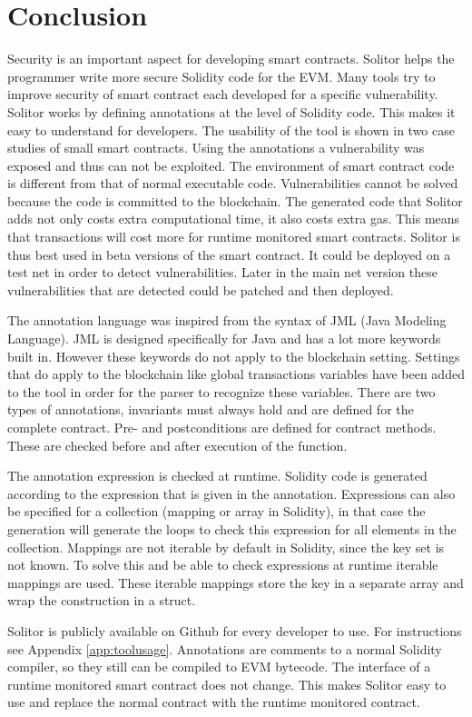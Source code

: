 \documentclass[a4paper]{article}
\begin{document}
\newpage
\section{Conclusion}
\label{sec:conclusion}
Security is an important aspect for developing smart contracts. Solitor helps the programmer write more secure Solidity code for the EVM. Many tools try to improve security of smart contract each developed for a specific vulnerability. Solitor works by defining annotations at the level of Solidity code. This makes it easy to understand for developers. The usability of the tool is shown in two case studies of small smart contracts. Using the annotations a vulnerability was exposed and thus can not be exploited. The environment of smart contract code is different from that of normal executable code. Vulnerabilities cannot be solved because the code is committed to the blockchain. The generated code that Solitor adds not only costs extra computational time, it also costs extra gas. This means that transactions will cost more for runtime monitored smart contracts. Solitor is thus best used in beta versions of the smart contract. It could be deployed on a test net in order to detect vulnerabilities. Later in the main net version these vulnerabilities that are detected could be patched and then deployed. \par
The annotation language was inspired from the syntax of JML (Java Modeling Language). JML is designed specifically for Java and has a lot more keywords built in. However these keywords do not apply to the blockchain setting. Settings that do apply to the blockchain like global transactions variables have been added to the tool in order for the parser to recognize these variables. There are two types of annotations, invariants must always hold and are defined for the complete contract. Pre- and postconditions are defined for contract methods. These are checked before and after execution of the function. \par
The annotation expression is checked at runtime. Solidity code is generated according to the expression that is given in the annotation. Expressions can also be specified for a collection (mapping or array in Solidity), in that case the generation will generate the loops to check this expression for all elements in the collection. Mappings are not iterable by default in Solidity, since the key set is not known. To solve this and be able to check expressions at runtime iterable mappings are used. These iterable mappings store the key in a separate array and wrap the construction in a struct. \par
Solitor is publicly available on Github for every developer to use. For instructions see Appendix \ref{app:toolusage}. Annotations are comments to a normal Solidity compiler, so they still can be compiled to EVM bytecode. The interface of a runtime monitored smart contract does not change. This makes Solitor easy to use and replace the normal contract with the runtime monitored contract. 
\end{document}
